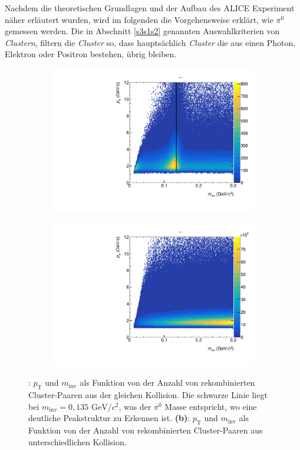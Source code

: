 Nachdem die theoretischen Grundlagen und der Aufbau des ALICE Experiment n\"aher erl\"autert wurden, wird im folgenden die Vorgehensweise erkl\"art, wie $\pi^{0}$ gemessen werden.
\newline
Die in Abschnitt \ref{s3s1s2} genannten Auswahlkriterien von \textit{Clustern}, filtern die \textit{Cluster} so, dass haupts\"achlich \textit{Cluster} die aus einen Photon, Elektron oder Positron bestehen, \"ubrig bleiben.
\newline
\begin{figure}[thp] \label{figInvMassPt}
\centering
\begin{subfigure}{.5\textwidth}
	\centering
	\includegraphics[width=.95\linewidth]{hInvMass_pT_Signal.pdf}
	\caption{}
	\label{figInvMassPt_a}
\end{subfigure}%
	\begin{subfigure}{.5\textwidth}
	\centering
	\includegraphics[width=.95\linewidth]{hInvMass_pT_Bkg.pdf}
	\caption{}
	\label{figInvMassPt_b}
\end{subfigure}
\caption{: $p_\text{T}$ und $m_\text{inv}$ als Funktion von der Anzahl von rekombinierten  Cluster-Paaren aus der gleichen Kollision.
Die schwarze Linie liegt bei $m_{\text{inv}}=0,135\text{ GeV/}c^{2}$, was der $\pi^{0}$ Masse entspricht, wo eine deutliche Peakstruktur zu Erkennen ist.
\newline
{\bf (b)}: $p_\text{T}$ und $m_\text{inv}$ als Funktion von der Anzahl von rekombinierten  Cluster-Paaren aus unterschiedlichen Kollision.}
\end{figure}

